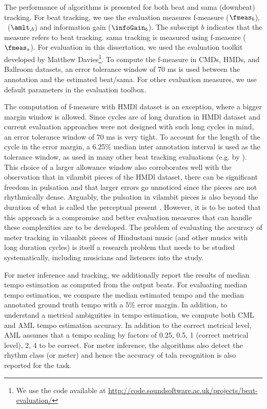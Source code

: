 The performance of algorithms is presented for both beat and \gls{sama} (downbeat) tracking. For beat tracking, we use the evaluation measures f-measure ($\fmeas_b$), \amlt\ ($\amlt_{,b}$) and information gain ($\infoGain_b$). The subscript $b$ indicates that the measure refers to beat tracking. \Gls{sama} tracking is measured using f-measure ($\fmeas_s$).  For evaluation in this dissertation, we used the evaluation toolkit developed by Matthew Davies\footnote{We use the code available at \url{http://code.soundsoftware.ac.uk/projects/beat-evaluation/}}. To compute the f-measure in \acrshort{CMDs}, \acrshort{HMDs}, and Ballroom datasets, an error tolerance window of 70 ms is used between the annotation and the estimated beat/\gls{sama}. For other evaluation measures, we use default parameters in the evaluation toolbox. 

The computation of f-measure with \acrshort{HMDl} dataset is an exception, where a bigger margin window is allowed. Since cycles are of long duration in \acrshort{HMDl} dataset and current evaluation approaches were not designed with such long cycles in mind, an error tolerance window of 70 ms is very tight. To account for the length of the cycle in the error margin, a 6.25\% median inter annotation interval is used as the tolerance window, as used in many other beat tracking evaluations (e.g. by ). This choice of a larger allowance window also corroborates well with the observation that in \gls{vilambit} pieces of the \acrshort{HMDl} dataset, there can be significant freedom in pulsation and that larger errors go unnoticed since the pieces are not rhythmically dense. Arguably, the pulsation in \gls{vilambit} pieces is also beyond the duration of what is called the perceptual present \cite{clarke:99:percpresent}.  However, it is to be noted that this approach is a compromise and better evaluation measures that can handle these complexities are to be developed. The problem of evaluating the accuracy of meter tracking in \gls{vilambit} pieces of Hindustani music (and other musics with long duration cycles) is itself a research problem that needs to be studied systematically, including musicians and listeners into the study. 

For meter inference and tracking, we additionally report the results of median tempo estimation as computed from the output beats. For evaluating median tempo estimation, we compare the median estimated tempo and the median annotated ground truth tempo with a 5\% error margin. In addition, to understand a metrical ambiguities in tempo estimation, we compute both \gls{CML} and \gls{AML} tempo estimation accuracy. In addition to the correct metrical level, \gls{AML} assumes that a tempo scaling by factors of 0.25, 0.5, 1 (correct metrical level), 2, 4 to be correct. For meter inference, the algorithms also detect the rhythm class (or meter) and hence the accuracy of \gls{tala} recognition is also reported for the task. 

